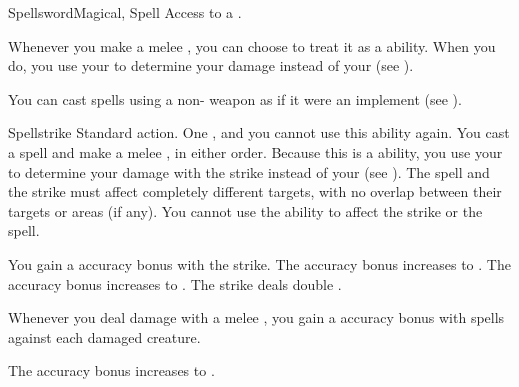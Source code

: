   \begin{magicalfeat}{Spellsword}{Magical, Spell}
    \featpre Access to a .

     Whenever you make a melee , you can choose to treat it as a \magical ability.
    When you do, you use your  to determine your damage instead of your  (see ).

     You can cast spells using a non- weapon as if it were an implement (see ).

    \begin{magicalactiveability}{Spellstrike}
      \abilityusagetime Standard action.
      \abilitycost One , and you  cannot use this ability again.
      \rankline
      You cast a spell and make a melee , in either order.
      Because this is a \magical ability, you use your  to determine your damage with the strike instead of your  (see ).
      The spell and the strike must affect completely different targets, with no overlap between their targets or areas (if any).
      You cannot use the  ability to affect the strike or the spell.

      \rankline
       You gain a  accuracy bonus with the strike.
       The accuracy bonus increases to .
       The accuracy bonus increases to .
       The strike deals double .
    \end{magicalactiveability}

     Whenever you deal damage with a melee , you  gain a  accuracy bonus with spells against each damaged creature.

     The accuracy bonus increases to .
  \end{magicalfeat}

